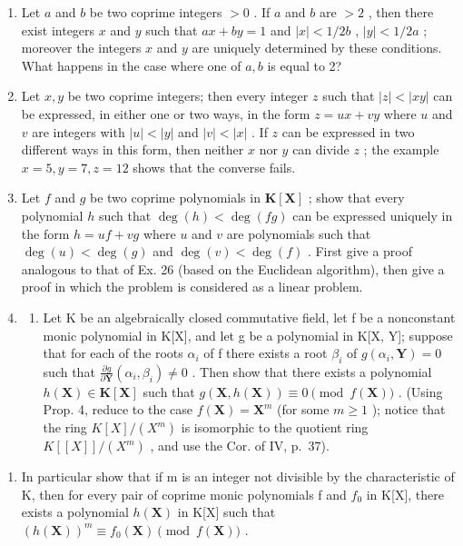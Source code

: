 \begin{enumerate}
\def\labelenumi{\arabic{enumi})}
\setcounter{enumi}{24}
\item
  Let \(a\) and \(b\) be two coprime integers \(> 0\) . If \(a\) and \(b\) are \(> 2\) , then there exist integers \(x\) and \(y\) such that \(ax + by = 1\) and \(|x| < 1/2b\) , \(|y| < 1/2a\) ; moreover the integers \(x\) and \(y\) are uniquely determined by these conditions. What happens in the case where one of \(a, b\) is equal to 2?
\item
  Let \(x, y\) be two coprime integers; then every integer \(z\) such that \(|z| < |xy|\) can be expressed, in either one or two ways, in the form \(z = ux + vy\) where \(u\) and \(v\) are integers with \(|u| < |y|\) and \(|v| < |x|\) . If \(z\) can be expressed in two different ways in this form, then neither \(x\) nor \(y\) can divide \(z\) ; the example \(x = 5, y = 7, z = 12\) shows that the converse fails.
\item
  Let \(f\) and \(g\) be two coprime polynomials in \(\mathbf{K}[\mathbf{X}]\) ; show that every polynomial \(h\) such that \(\deg(h) < \deg(fg)\) can be expressed uniquely in the form \(h = uf + vg\) where \(u\) and \(v\) are polynomials such that \(\deg(u) < \deg(g)\) and \(\deg(v) < \deg(f)\) . First give a proof analogous to that of Ex. 26 (based on the Euclidean algorithm), then give a proof in which the problem is considered as a linear problem.
\item
  \begin{enumerate}
  \def\labelenumii{\alph{enumii})}
  \tightlist
  \item
    Let K be an algebraically closed commutative field, let f be a nonconstant monic polynomial in K{[}X{]}, and let g be a polynomial in K{[}X, Y{]}; suppose that for each of the roots \(\alpha_{i}\) of f there exists a root \(\beta_{i}\) of \(g(\alpha_{i}, \mathbf{Y}) = 0\) such that \(\frac{\partial g}{\partial \mathbf{Y}} (\alpha_{i}, \beta_{i}) \neq 0\) . Then show that there exists a polynomial \(h(\mathbf{X}) \in \mathbf{K}[\mathbf{X}]\) such that \(g(\mathbf{X}, h(\mathbf{X})) \equiv 0 \pmod{f(\mathbf{X})}\) . (Using Prop. 4, reduce to the case \(f(\mathbf{X}) = \mathbf{X}^{m}\) (for some \(m \geqslant 1\) ); notice that the ring \(K[X]/(X^{m})\) is isomorphic to the quotient ring \(K[[X]]/(X^{m})\) , and use the Cor. of IV, p.~37).
  \end{enumerate}
\end{enumerate}

\begin{enumerate}
\def\labelenumi{\alph{enumi})}
\setcounter{enumi}{1}
\tightlist
\item
  In particular show that if m is an integer not divisible by the characteristic of K, then for every pair of coprime monic polynomials f and \(f_{0}\) in K{[}X{]}, there exists a polynomial \(h(\mathbf{X})\) in K{[}X{]} such that \((h(\mathbf{X}))^{m} \equiv f_{0}(\mathbf{X}) \pmod{f(\mathbf{X})}\) .
\end{enumerate}

